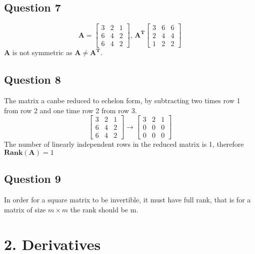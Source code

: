 \documentclass{article}
\begin{document}
\subsection{Question 7}
$$
\mathbf{A} =  
\begin{bmatrix}
3 & 2 & 1 \\
6 & 4 & 2 \\
6 & 4 & 2
\end{bmatrix}
\textbf{, }
\mathbf{A^T}
\begin{bmatrix}
3 & 6 & 6 \\
2 & 4 & 4 \\
1 & 2 & 2
\end{bmatrix}
$$
\textbf{A} is not symmetric as $\mathbf{A} \neq \mathbf{A^T}$.
\subsection{Question 8}
The matrix a canbe reduced to echelon form, by subtracting two times row 1 from row 2 and one time row 2 from row 3.
$$
\begin{bmatrix}
3 & 2 & 1 \\
6 & 4 & 2 \\
6 & 4 & 2
\end{bmatrix}
\rightarrow
\begin{bmatrix}
3 & 2 & 1 \\
0 & 0 & 0 \\
0 & 0 & 0
\end{bmatrix}
$$
The number of linearly independent rows in the reduced matrix is 1, therefore $\mathbf{Rank}(\mathbf{A}) = 1$
\subsection{Question 9}
In order for a square matrix to be invertible, it must have full rank, that is for a matrix of size $m \times m$ the rank should be m.
\section{2. Derivatives}
\end{document}
